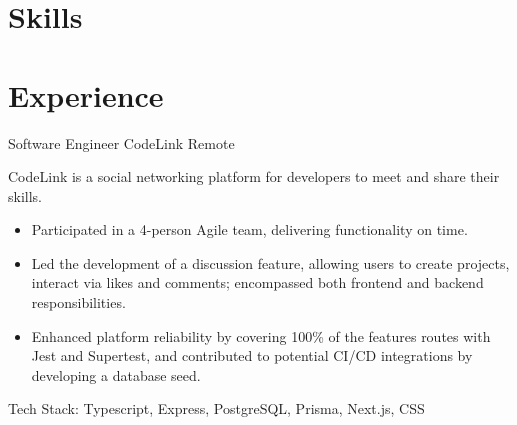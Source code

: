 \section{Skills}



\section{Experience}
  {Software Engineer}
  {CodeLink}
  {Remote}
  {}
  {
    CodeLink is a social networking platform for developers to meet and share their skills.
    \begin{itemize}
    	\item Participated in a 4-person Agile team, delivering functionality on time.
    	\item Led the development of a discussion feature, allowing users to create projects, interact via likes and comments; encompassed both frontend and backend responsibilities.
    	\item Enhanced platform reliability by covering 100\% of the features routes with Jest and Supertest, and contributed to potential CI/CD integrations by developing a database seed.
    \end{itemize}
Tech Stack: Typescript, Express, PostgreSQL, Prisma, Next.js, CSS
  }


